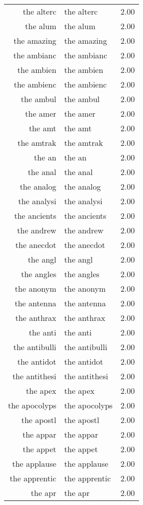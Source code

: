 \begin{table}[ht]
\begin{tabular}{rlr}
  the alterc & the alterc & 2.00 \\ 
  the alum & the alum & 2.00 \\ 
  the amazing & the amazing & 2.00 \\ 
  the ambianc & the ambianc & 2.00 \\ 
  the ambien & the ambien & 2.00 \\ 
  the ambienc & the ambienc & 2.00 \\ 
  the ambul & the ambul & 2.00 \\ 
  the amer & the amer & 2.00 \\ 
  the amt & the amt & 2.00 \\ 
  the amtrak & the amtrak & 2.00 \\ 
  the an & the an & 2.00 \\ 
  the anal & the anal & 2.00 \\ 
  the analog & the analog & 2.00 \\ 
  the analysi & the analysi & 2.00 \\ 
  the ancients & the ancients & 2.00 \\ 
  the andrew & the andrew & 2.00 \\ 
  the anecdot & the anecdot & 2.00 \\ 
  the angl & the angl & 2.00 \\ 
  the angles & the angles & 2.00 \\ 
  the anonym & the anonym & 2.00 \\ 
  the antenna & the antenna & 2.00 \\ 
  the anthrax & the anthrax & 2.00 \\ 
  the anti & the anti & 2.00 \\ 
  the antibulli & the antibulli & 2.00 \\ 
  the antidot & the antidot & 2.00 \\ 
  the antithesi & the antithesi & 2.00 \\ 
  the apex & the apex & 2.00 \\ 
  the apocolyps & the apocolyps & 2.00 \\ 
  the apostl & the apostl & 2.00 \\ 
  the appar & the appar & 2.00 \\ 
  the appet & the appet & 2.00 \\ 
  the applause & the applause & 2.00 \\ 
  the apprentic & the apprentic & 2.00 \\ 
  the apr & the apr & 2.00 \\ 

\end{tabular}
\end{table}
